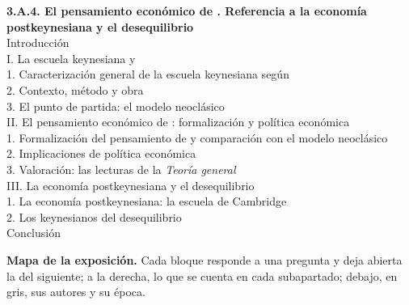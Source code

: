 \documentclass[11pt]{article}
\begin{document}
\begin{esquema}[unbreakable]
\textbf{3.A.4. El pensamiento económico de . Referencia a la economía postkeynesiana y el desequilibrio}\\[2pt]
Introducción\\
I. La escuela keynesiana y \\
\hspace*{1.5em}1. Caracterización general de la escuela keynesiana según \\
\hspace*{1.5em}2. Contexto, método y obra\\
\hspace*{1.5em}3. El punto de partida: el modelo neoclásico\\
II. El pensamiento económico de : formalización y política económica\\
\hspace*{1.5em}1. Formalización del pensamiento de  y comparación con el modelo neoclásico\\
\hspace*{1.5em}2. Implicaciones de política económica\\
\hspace*{1.5em}3. Valoración: las lecturas de la \emph{Teoría general}\\
III. La economía postkeynesiana y el desequilibrio\\
\hspace*{1.5em}1. La economía postkeynesiana: la escuela de Cambridge\\
\hspace*{1.5em}2. Los keynesianos del desequilibrio\\
Conclusión
\end{esquema}

\begin{anotaciones}
\textbf{Mapa de la exposición.} Cada bloque responde a una pregunta y deja abierta la del siguiente; a la derecha, lo que se cuenta en cada subapartado; debajo, en gris, sus autores y su época.
\begin{infografiacaja}
\caption{Mapa del tema: la pregunta de cada bloque, sus subapartados y el hilo que los une}\label{figu:mapa-tema}
\end{infografiacaja}
\end{anotaciones}
\end{document}
